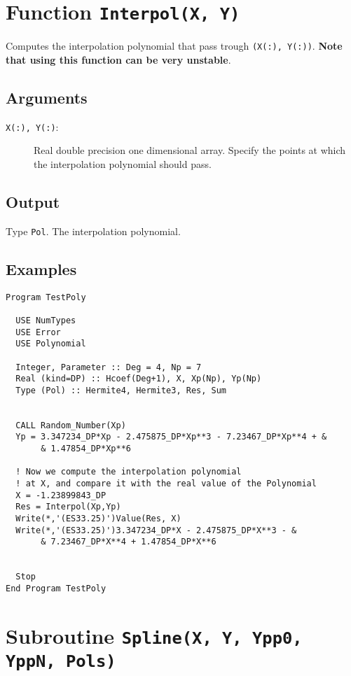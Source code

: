 \section{Function \texttt{Interpol(X, Y)}}

Computes the interpolation polynomial that pass trough
\texttt{(X(:), Y(:))}. \textbf{Note that using this function can be
very unstable}.

\subsection{Arguments}

\begin{description}
\item[\texttt{X(:), Y(:)}:] Real double precision one dimensional
  array. Specify the points at which the interpolation polynomial
  should pass. 
\end{description}

\subsection{Output}

Type \texttt{Pol}. The interpolation polynomial.

\subsection{Examples}

\begin{verbatim}
Program TestPoly

  USE NumTypes
  USE Error
  USE Polynomial

  Integer, Parameter :: Deg = 4, Np = 7
  Real (kind=DP) :: Hcoef(Deg+1), X, Xp(Np), Yp(Np)
  Type (Pol) :: Hermite4, Hermite3, Res, Sum


  CALL Random_Number(Xp)
  Yp = 3.347234_DP*Xp - 2.475875_DP*Xp**3 - 7.23467_DP*Xp**4 + &
       & 1.47854_DP*Xp**6

  ! Now we compute the interpolation polynomial
  ! at X, and compare it with the real value of the Polynomial
  X = -1.23899843_DP
  Res = Interpol(Xp,Yp)
  Write(*,'(ES33.25)')Value(Res, X)
  Write(*,'(ES33.25)')3.347234_DP*X - 2.475875_DP*X**3 - &
       & 7.23467_DP*X**4 + 1.47854_DP*X**6


  Stop
End Program TestPoly
\end{verbatim}

\section{Subroutine \texttt{Spline(X, Y, Ypp0, YppN, Pols)}}

